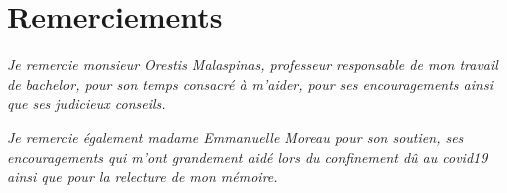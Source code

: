 \chapter*{Remerciements} %

\textit{Je remercie monsieur Orestis Malaspinas, professeur responsable de mon travail de bachelor, pour son temps consacré à m’aider, pour ses encouragements ainsi que ses judicieux conseils.}

\textit{Je remercie également madame Emmanuelle Moreau pour son soutien, ses encouragements qui m'ont grandement aidé lors du confinement dû au covid19 ainsi que pour la relecture de mon mémoire.}
